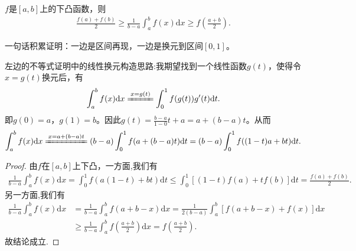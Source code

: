 \documentclass[../../main.tex]{subfiles}%
\begin{document}
\begin{theorem}[Hadamard不等式]\label{theorem:Hadamard不等式}
\(f\)是\([a,b]\)上的下凸函数，则
\begin{align*}
\frac{f(a)+f(b)}{2} \geqslant \frac{1}{b - a}\int_{a}^{b}f(x)\mathrm{d}x \geqslant f\left(\frac{a + b}{2}\right).
\end{align*} 
\end{theorem}
\begin{note}
一句话积累证明：一边是区间再现，一边是换元到区间\([0,1]\)。
\end{note}
\begin{remark}
左边的不等式证明中的线性换元构造思路:我期望找到一个线性函数$g(t)$，使得令$x = g(t)$换元后，有
\begin{align*}
\int_a^b f(x) \mathrm{d}x \xlongequal{x = g(t)} \int_0^1 f(g(t))g'(t) \mathrm{d}t.
\end{align*}
即$g(0) = a$，$g(1) = b$。因此$g(t) = \frac{b - a}{1 - 0}t + a = a + (b - a)t$。从而
\begin{align*}
\int_a^b f(x) \mathrm{d}x \xlongequal{x = a + (b - a)t} (b - a)\int_0^1 f(a + (b - a)t) \mathrm{d}t = (b - a)\int_0^1 f((1 - t)a + bt) \mathrm{d}t.
\end{align*} 
\end{remark}
\begin{proof}

由$f$在$[a,b]$上下凸，一方面,我们有
\begin{align*}
\frac{1}{b - a}\int_{a}^{b}f(x)\mathrm{d}x = \int_{0}^{1}f(a(1 - t)+bt)\mathrm{d}t \leqslant \int_{0}^{1}[(1 - t)f(a)+tf(b)]\mathrm{d}t = \frac{f(a)+f(b)}{2}.
\end{align*}
另一方面,我们有
\begin{align*}
\frac{1}{b - a}\int_{a}^{b}f(x)\mathrm{d}x &= \frac{1}{b - a}\int_{a}^{b}f(a + b - x)\mathrm{d}x
= \frac{1}{2(b - a)}\int_{a}^{b}[f(a + b - x)+f(x)]\mathrm{d}x\\
&\geqslant \frac{1}{b - a}\int_{a}^{b}f\left(\frac{a + b}{2}\right)\mathrm{d}x
= f\left(\frac{a + b}{2}\right).
\end{align*}
故结论成立.

\end{proof}
\end{document}

